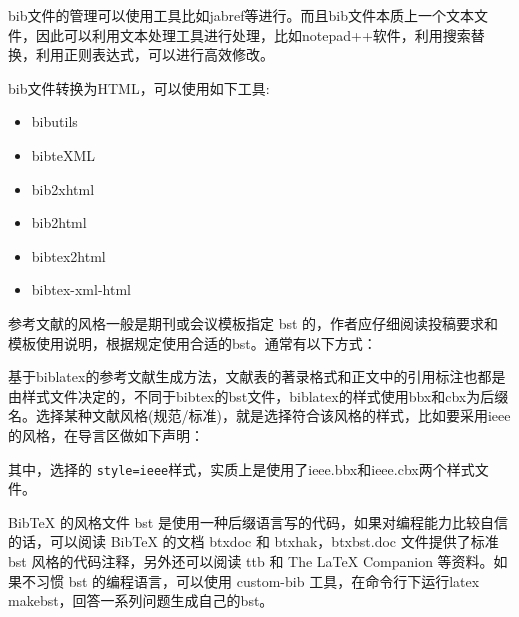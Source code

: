 bib文件的管理可以使用工具比如jabref等进行。而且bib文件本质上一个文本文件，因此可以利用文本处理工具进行处理，比如notepad++软件，利用搜索替换，利用正则表达式，可以进行高效修改。




bib文件转换为HTML，可以使用如下工具:
\begin{itemize}
  \item bibutils

  \item bibteXML

  \item bib2xhtml

  \item bib2html

  \item bibtex2html

  \item bibtex-xml-html
\end{itemize}




参考文献的风格一般是期刊或会议模板指定 bst 的，作者应仔细阅读投稿要求和模板使用说明，根据规定使用合适的bst。通常有以下方式：


基于biblatex的参考文献生成方法，文献表的著录格式和正文中的引用标注也都是由样式文件决定的，不同于bibtex的bst文件，biblatex的样式使用bbx和cbx为后缀名。选择某种文献风格(规范/标准)，就是选择符合该风格的样式，比如要采用ieee的风格，在导言区做如下声明：

\begin{texlist}
\usepackage[backend=biber,style=ieee]{biblatex}
\end{texlist}

其中，选择的 \verb|style=ieee|样式，实质上是使用了ieee.bbx和ieee.cbx两个样式文件。




BibTeX 的风格文件 bst 是使用一种后缀语言写的代码，如果对编程能力比较自信的话，可以阅读 BibTeX 的文档 btxdoc 和 btxhak，btxbst.doc 文件提供了标准 bst 风格的代码注释，另外还可以阅读 ttb 和 The LaTeX Companion 等资料。如果不习惯 bst 的编程语言，可以使用 custom-bib 工具，在命令行下运行latex makebst，回答一系列问题生成自己的bst。

